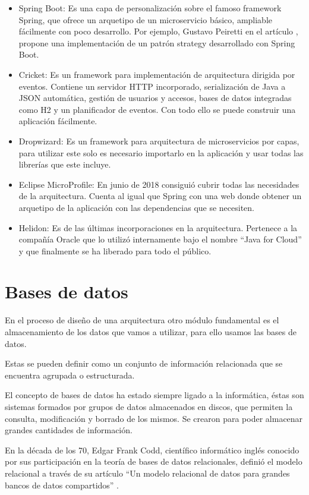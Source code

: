 \documentclass[12pt]{report} %
\begin{document}
 \begin{itemize}
 	\item Spring Boot: Es una capa de personalización sobre el famoso framework Spring, que ofrece un arquetipo de un microservicio básico, ampliable fácilmente con poco desarrollo. Por ejemplo, Gustavo Peiretti en el artículo \cite{StrategySpringBoot}, propone una implementación de un patrón strategy desarrollado con Spring Boot.
 	\item Cricket: Es un framework para implementación de arquitectura dirigida por eventos. Contiene un servidor HTTP incorporado, serialización de Java a JSON automática, gestión de usuarios y accesos, bases de datos integradas como H2 y un planificador de eventos. Con todo ello se puede construir una aplicación fácilmente.
 	\item Dropwizard: Es un framework para arquitectura de microservicios por capas, para utilizar este solo es necesario importarlo en la aplicación y usar todas las librerías que este incluye.
 	\item Eclipse MicroProfile: En junio de 2018 consiguió cubrir todas las necesidades de la arquitectura. Cuenta al igual que Spring con una web donde obtener un arquetipo de la aplicación con las dependencias que se necesiten.
 	\item Helidon: Es de las últimas incorporaciones en la arquitectura. Pertenece a la compañía Oracle que lo utilizó internamente bajo el nombre “Java for Cloud” y que finalmente se ha liberado para todo el público. 
 \end{itemize}
	
	\section{Bases de datos}
	En el proceso de diseño de una arquitectura otro módulo fundamental es el almacenamiento de los datos que vamos a utilizar, para ello usamos las bases de datos.

	Estas se pueden definir como un conjunto de información relacionada que se encuentra agrupada o estructurada.
	
	El concepto de bases de datos ha estado siempre ligado a la informática, éstas son sistemas formados por grupos de datos almacenados en discos, que permiten la consulta, modificación y borrado de los mismos. Se crearon para poder almacenar grandes cantidades de información. 
	
	En la década de los 70, Edgar Frank Codd, científico informático inglés conocido por sus participación en la teoría de bases de datos relacionales, definió el modelo relacional  a través de su artículo “Un modelo relacional de datos para grandes bancos de datos compartidos” \cite{RelationalModel}.
	
\end{document}

